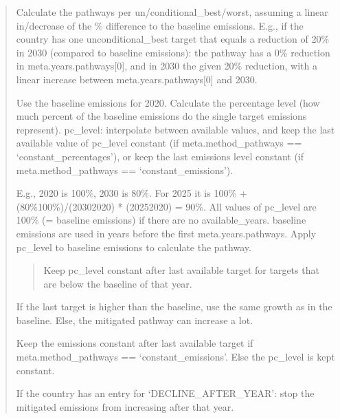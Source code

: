 \documentclass[letterpaper,10pt,english]{sphinxmanual}
\begin{document}
\begin{quote}

Calculate the pathways per un/conditional\_best/worst, assuming a linear in/decrease of the
\% difference to the baseline emissions.
E.g., if the country has one unconditional\_best target that equals a reduction of 20\% in 2030
(compared to baseline emissions):
the pathway has a 0\% reduction in meta.years.pathways{[}0{]}, and in 2030 the given
20\% reduction, with a linear increase between meta.years.pathways{[}0{]} and 2030.

Use the baseline emissions for 2020.
Calculate the percentage level (how much percent of the baseline emissions do
the single target emissions represent).
pc\_level: interpolate between available values, and keep the last available value of pc\_level constant
(if meta.method\_pathways == ‘constant\_percentages’), or keep the last emissions level constant
(if meta.method\_pathways == ‘constant\_emissions’).

E.g., 2020 is 100\%, 2030 is 80\%. For 2025 it is 100\% + (80\%\sphinxhyphen{}100\%)/(2030\sphinxhyphen{}2020) * (2025\sphinxhyphen{}2020) = 90\%.
All values of pc\_level are 100\% (= baseline emissions) if there are no available\_years.
baseline emissions are used in years before the first meta.years.pathways.
Apply pc\_level to baseline emissions to calculate the pathway.
\begin{quote}

Keep pc\_level constant after last available target for targets that are below the baseline of that year.
\end{quote}

If the last target is higher than the baseline, use the same growth as in the baseline.
Else, the mitigated pathway can increase a lot.

Keep the emissions constant after last available target if meta.method\_pathways == ‘constant\_emissions’.
Else the pc\_level is kept constant.

If the country has an entry for ‘DECLINE\_AFTER\_YEAR’: stop the mitigated emissions from increasing after that year.
\end{quote}
\end{document}
